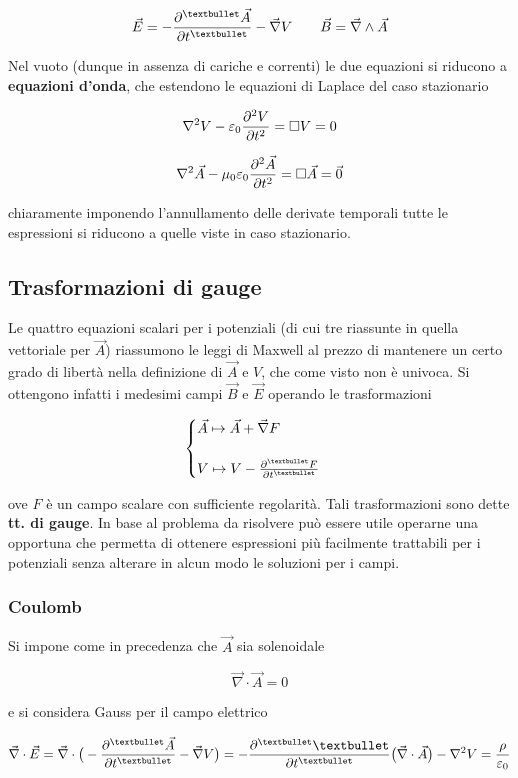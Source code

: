 \[\vec{E} = - \pdv[•]{\vec{A}}{t} - \vec{\nabla}V \qquad \vec{B} = \vec{\nabla} \wedge \vec{A}\]

Nel vuoto (dunque in assenza di cariche e correnti) le due equazioni si riducono a \textbf{equazioni d'onda}, che estendono le equazioni di Laplace del caso stazionario

\[\nabla^2 V - \varepsilon_0 \pdv[2]{V}{t} = \Box V = 0\]

\[\nabla^2 \vec{A} - \mu_0 \varepsilon_0 \pdv[2]{\vec{A}}{t} = \Box \vec{A} = \vec{0}\]

chiaramente imponendo l'annullamento delle derivate temporali tutte le espressioni si riducono a quelle viste in caso stazionario.

\subsection{Trasformazioni di gauge}

Le quattro equazioni scalari per i potenziali (di cui tre riassunte in quella vettoriale per $\vec{A}$) riassumono le leggi di Maxwell al prezzo di mantenere un certo grado di libertà nella definizione di $\vec{A}$ e $V$, che come visto non è univoca. Si ottengono infatti i medesimi campi $\vec{B}$ e $\vec{E}$ operando le trasformazioni

\[\begin{cases}
\vec{A} \mapsto \vec{A} + \vec{\nabla}F \\
\\
V \mapsto V - \pdv[•]{F}{t}
\end{cases}\]

ove $F$ è un campo scalare con sufficiente regolarità. Tali trasformazioni sono dette \textbf{tt. di gauge}. In base al problema da risolvere può essere utile operarne una opportuna che permetta di ottenere espressioni più facilmente trattabili per i potenziali senza alterare in alcun modo le soluzioni per i campi.

\subsubsection*{Coulomb}

Si impone come in precedenza che $\vec{A}$ sia solenoidale

\[\vec{\nabla} \cdot \vec{A} = 0\]

e si considera Gauss per il campo elettrico

\[\vec{\nabla} \cdot \vec{E} = \vec{\nabla} \cdot \big(- \pdv[•]{\vec{A}}{t} - \vec{\nabla}V\big) = - \pdv[•]{•}{t} \big(\vec{\nabla} \cdot \vec{A}\big) - \nabla^2 V = \frac{\rho}{\varepsilon_0}\]

